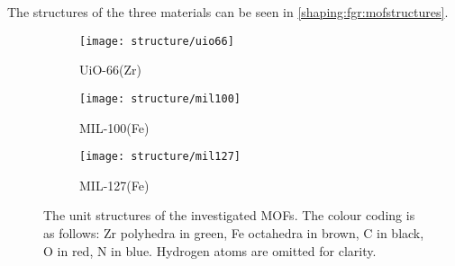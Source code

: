 The structures of the three materials can be seen 
in \autoref{shaping:fgr:mofstructures}.

\begin{figure}[t]
	\centering
	\begin{subfigure}{0.3\textwidth}
		\texttt{[image: structure/uio66]}
		\caption{UiO-66(Zr)}
	\end{subfigure}
	\begin{subfigure}{0.3\textwidth}
		\texttt{[image: structure/mil100]}
		\caption{MIL-100(Fe)}
	\end{subfigure}
	\begin{subfigure}{0.3\textwidth}
		\texttt{[image: structure/mil127]}
		\caption{MIL-127(Fe)}
	\end{subfigure}

	\caption{The unit structures of the investigated MOFs.
		The colour coding is as follows: Zr polyhedra in green,
		Fe octahedra in brown, C in black, O in red, N in blue.
		Hydrogen atoms are omitted for clarity.}%
	\label{shaping:fgr:mofstructures}
\end{figure}
